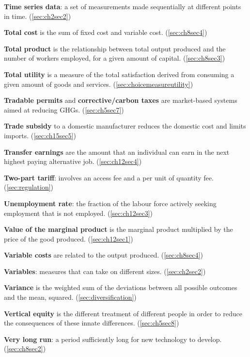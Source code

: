 \textbf{Time series data}: a set of measurements made sequentially at different points in time. (\ref{sec:ch2sec2})

\textbf{Total cost} is the sum of fixed cost and variable cost. (\ref{sec:ch8sec4})

\textbf{Total product} is the relationship between total output produced and the number of workers employed, for a given amount of capital. (\ref{sec:ch8sec3})

\textbf{Total utility} is a measure of the total satisfaction derived from consuming a given amount of goods and services. (\ref{sec:choicemeasureutility})

\textbf{Tradable permits} and \textbf{corrective/carbon taxes} are market-based systems aimed at reducing GHGs. (\ref{sec:ch5sec7})

\textbf{Trade subsidy} to a domestic manufacturer reduces the domestic cost and limits imports. (\ref{sec:ch15sec5})

\textbf{Transfer earnings} are the amount that an individual can earn in the next highest paying alternative job. (\ref{sec:ch12sec4})

\textbf{Two-part tariff}: involves an access fee and a per unit of quantity fee. (\ref{sec:regulation})

\textbf{Unemployment rate}: the fraction of the labour force actively seeking employment that is not employed. (\ref{sec:ch12sec3})

\textbf{Value of the marginal product} is the marginal product multiplied by the price of the good produced. (\ref{sec:ch12sec1})

\textbf{Variable costs} are related to the output produced. (\ref{sec:ch8sec4})

\textbf{Variables}: measures that can take on different sizes. (\ref{sec:ch2sec2})

\textbf{Variance} is the weighted sum of the deviations between all possible outcomes and the mean, squared. (\ref{sec:diversification})

\textbf{Vertical equity} is the different treatment of different people in order to reduce the consequences of these innate differences. (\ref{sec:ch5sec8})

\textbf{Very long run}: a period sufficiently long for new technology to develop. (\ref{sec:ch8sec2})